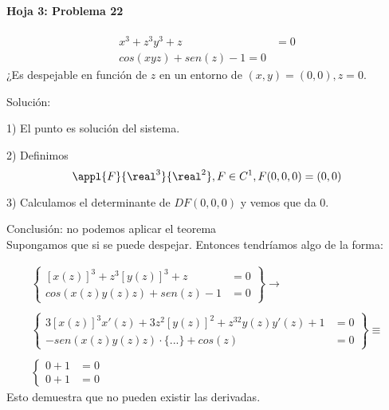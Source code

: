 \paragraph{Hoja 3: Problema 22}

\[\begin{array}{cc}
   x^3+z^3y^3+z &= 0\\
   cos(xyz)+sen(z)-1 = 0
  \end{array}\]
 ¿Es despejable en función de $z$ en un entorno de $(x,y) = (0,0), z=0$.
 
 Solución:
 
 1) El punto es solución del sistema.
 
 2) Definimos \[\appl{F}{\real^3}{\real^2}, F\in C^1, F(0,0,0)=(0,0)\]
 
 3) Calculamos el determinante de $DF(0,0,0)$ y vemos que da $0$.
 
 Conclusión: no podemos aplicar el teorema\\
 Supongamos que si se puede despejar. Entonces tendríamos algo de la forma:

 \begin{gather*}
 \left\{\begin{array}{cc}
   [x(z)]^3+z^3[y(z)]^3+z &= 0\\
   cos(x(z)y(z)z)+sen(z)-1 &= 0
  \end{array}\right\}\rightarrow\\
  \,\\
   \left\{ \begin{array}{cc}
               3[x(z)]^3x'(z) + 3z^2[y(z)]^2 + z^32y(z)y'(z) + 1 &=0\\
               -sen(x(z)y(z)z) \cdot\{...\} + cos(z) &= 0
              \end{array}\right\}
              \equiv\\\,\\
              \left\{
              \begin{array}{cc}
               0+1&=0\\
               0+1&=0
              \end{array}\right.
 \end{gather*}
  Esto demuestra que no pueden existir las derivadas.